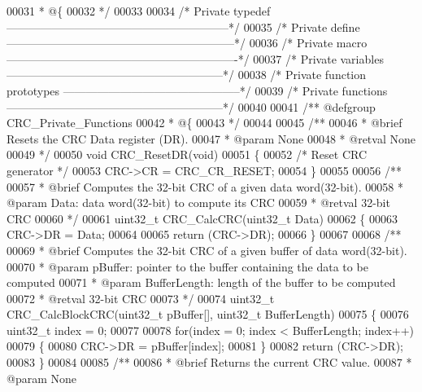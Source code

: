 \begin{DoxyCode}
00031 \textcolor{comment}{  * @\{}
00032 \textcolor{comment}{  */}
00033 
00034 \textcolor{comment}{/* Private typedef -----------------------------------------------------------*/}
00035 \textcolor{comment}{/* Private define ------------------------------------------------------------*/}
00036 \textcolor{comment}{/* Private macro -------------------------------------------------------------*/}
00037 \textcolor{comment}{/* Private variables ---------------------------------------------------------*/}
00038 \textcolor{comment}{/* Private function prototypes -----------------------------------------------*/}
00039 \textcolor{comment}{/* Private functions ---------------------------------------------------------*/}
00040 
00041 \textcolor{comment}{/** @defgroup CRC\_Private\_Functions}
00042 \textcolor{comment}{  * @\{}
00043 \textcolor{comment}{  */}
00044 
00045 \textcolor{comment}{/**}
00046 \textcolor{comment}{  * @brief  Resets the CRC Data register (DR).}
00047 \textcolor{comment}{  * @param  None}
00048 \textcolor{comment}{  * @retval None}
00049 \textcolor{comment}{  */}
00050 \textcolor{keywordtype}{void} CRC_ResetDR(\textcolor{keywordtype}{void})
00051 \{
00052   \textcolor{comment}{/* Reset CRC generator */}
00053   CRC->CR = CRC_CR_RESET;
00054 \}
00055 
00056 \textcolor{comment}{/**}
00057 \textcolor{comment}{  * @brief  Computes the 32-bit CRC of a given data word(32-bit).}
00058 \textcolor{comment}{  * @param  Data: data word(32-bit) to compute its CRC}
00059 \textcolor{comment}{  * @retval 32-bit CRC}
00060 \textcolor{comment}{  */}
00061 uint32\_t CRC_CalcCRC(uint32\_t Data)
00062 \{
00063   CRC->DR = Data;
00064 
00065   \textcolor{keywordflow}{return} (CRC->DR);
00066 \}
00067 
00068 \textcolor{comment}{/**}
00069 \textcolor{comment}{  * @brief  Computes the 32-bit CRC of a given buffer of data word(32-bit).}
00070 \textcolor{comment}{  * @param  pBuffer: pointer to the buffer containing the data to be computed}
00071 \textcolor{comment}{  * @param  BufferLength: length of the buffer to be computed                   }
00072 \textcolor{comment}{  * @retval 32-bit CRC}
00073 \textcolor{comment}{  */}
00074 uint32\_t CRC_CalcBlockCRC(uint32\_t pBuffer[], uint32\_t BufferLength)
00075 \{
00076   uint32\_t index = 0;
00077 
00078   \textcolor{keywordflow}{for}(index = 0; index < BufferLength; index++)
00079   \{
00080     CRC->DR = pBuffer[index];
00081   \}
00082   \textcolor{keywordflow}{return} (CRC->DR);
00083 \}
00084 
00085 \textcolor{comment}{/**}
00086 \textcolor{comment}{  * @brief  Returns the current CRC value.}
00087 \textcolor{comment}{  * @param  None}

\end{DoxyCode}
